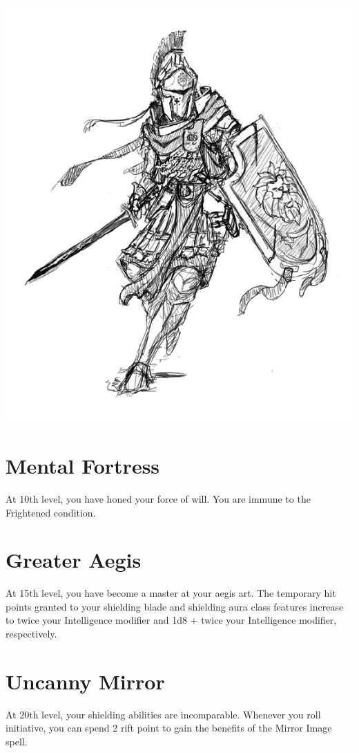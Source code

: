 \begin{multicols*}{2}
\begin{Figure}
\centering
\includegraphics[width=\textwidth]{img/centurion.png}
\end{Figure}    

\section*{Mental Fortress}

At 10th level, you have honed your force of will. You are immune to the Frightened condition.


    



\section*{Greater Aegis}

At 15th level, you have become a master at your aegis art. The temporary hit points granted to your shielding blade and shielding aura class features increase to twice your Intelligence modifier and 1d8 + twice your Intelligence modifier, respectively.

\section*{Uncanny Mirror}

At 20th level, your shielding abilities are incomparable. Whenever you roll initiative, you can spend 2 rift point to gain the benefits of the Mirror Image spell. 


\end{multicols*}




